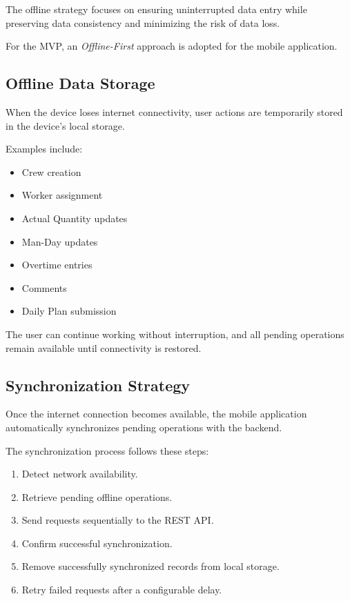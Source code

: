\documentclass[11pt]{article}
\begin{document}
The offline strategy focuses on ensuring uninterrupted data entry while
preserving data consistency and minimizing the risk of data loss.

For the MVP, an \textit{Offline-First} approach is adopted for the mobile
application.

\subsection{Offline Data Storage}

When the device loses internet connectivity, user actions are temporarily
stored in the device's local storage.

Examples include:

\begin{itemize}
    \item Crew creation
    \item Worker assignment
    \item Actual Quantity updates
    \item Man-Day updates
    \item Overtime entries
    \item Comments
    \item Daily Plan submission
\end{itemize}

The user can continue working without interruption, and all pending operations
remain available until connectivity is restored.

\subsection{Synchronization Strategy}

Once the internet connection becomes available, the mobile application
automatically synchronizes pending operations with the backend.

The synchronization process follows these steps:

\begin{enumerate}
    \item Detect network availability.
    \item Retrieve pending offline operations.
    \item Send requests sequentially to the REST API.
    \item Confirm successful synchronization.
    \item Remove successfully synchronized records from local storage.
    \item Retry failed requests after a configurable delay.
\end{enumerate}
\end{document}
